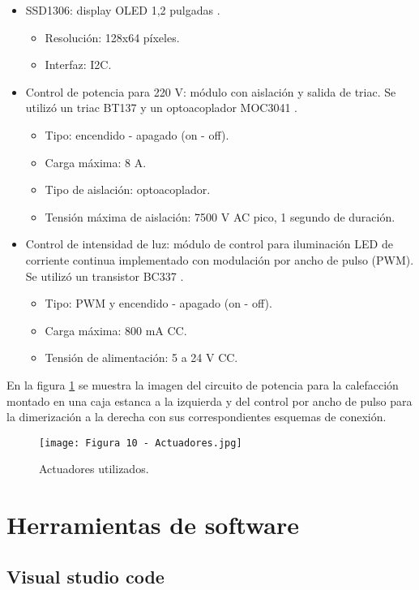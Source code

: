 \begin{itemize}
\item SSD1306: display OLED 1,2 pulgadas \citep{35}.
	\begin{itemize}
		\item Resolución: 128x64 píxeles.
		\item Interfaz: I2C.
	\end{itemize}
	\item Control de potencia para 220 V: módulo con aislación y salida de triac. Se utilizó un triac BT137 \citep{36} y un optoacoplador MOC3041 \citep{37}.
	\begin{itemize}
		\item Tipo: encendido - apagado (on - off).
		\item Carga máxima: 8 A.
		\item Tipo de aislación: optoacoplador.
		\item Tensión máxima de aislación: 7500 V AC pico, 1 segundo de duración.
	\end{itemize}
	\item Control de intensidad de luz: módulo de control para iluminación LED de corriente continua implementado con modulación por ancho de pulso (PWM). Se utilizó un transistor BC337 \citep{38}.
	\begin{itemize}
		\item Tipo: PWM y encendido - apagado (on - off).
		\item Carga máxima: 800 mA CC.
		\item Tensión de alimentación: 5 a 24 V CC.
	\end{itemize}
\end{itemize}

En la figura \ref{fig:10} se muestra la imagen del circuito de potencia para la calefacción montado en una caja estanca a la izquierda y del control por ancho de pulso para la dimerización a la derecha con sus correspondientes esquemas de conexión.

\begin{figure}[h]
\centering
\texttt{[image: Figura 10 - Actuadores.jpg]}
\caption[Actuadores]{Actuadores utilizados.}
\label{fig:10}
\end{figure}

\section{Herramientas de software}

\subsection{Visual studio code} \citep{14}

